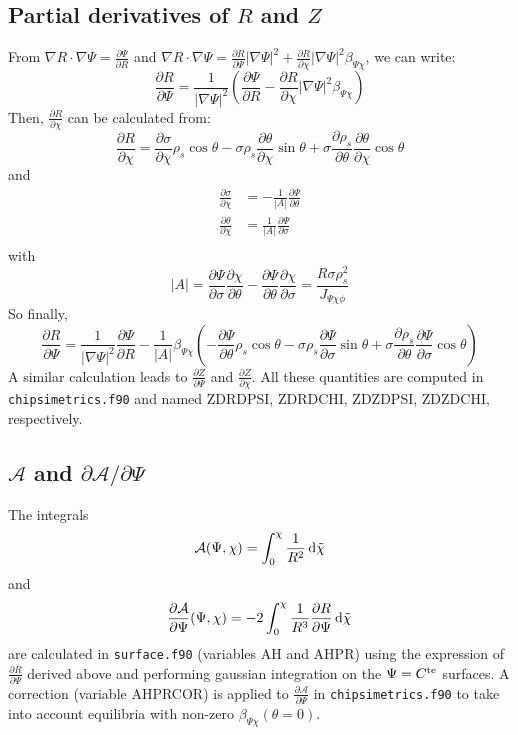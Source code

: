 \documentclass[a4paper,12pt]{article}
\newcommand{\expo}[1]{\ensuremath{^{\rm{#1}}}}
\begin{document}
\subsection{Partial derivatives of $R$ and $Z$}
From $\nabla R\cdot \nabla \Psi=\frac{\partial \Psi}{\partial R}$ and $\nabla R\cdot \nabla \Psi= \frac{\partial R}{\partial \Psi}|\nabla \Psi|^2 + \frac{\partial R}{\partial \chi}|\nabla \Psi|^2 \beta_{\Psi \chi}$, we can write:
$$\frac{\partial R}{\partial \Psi}= \frac{1}{|\nabla \Psi|^2}\left( \frac{\partial \Psi}{\partial R} - \frac{\partial R}{\partial \chi}|\nabla \Psi|^2 \beta_{\Psi \chi}\right)$$
Then, $\frac{\partial R}{\partial \chi}$ can be calculated from:
$$\frac{\partial R}{\partial \chi}=\frac{\partial \sigma}{\partial \chi}\rho_s\cos{\theta}-\sigma\rho_s\frac{\partial \theta}{\partial \chi}\sin{\theta} +\sigma  \frac{\partial \rho_s}{\partial\theta} \frac{\partial\theta}{\partial\chi}\cos{\theta}$$
and
\begin{align*}
\frac{\partial\sigma}{\partial\chi}&=-\frac{1}{|A|}\frac{\partial\Psi}{\partial\theta}\\
\frac{\partial\theta}{\partial\chi}&=\frac{1}{|A|}\frac{\partial\Psi}{\partial\sigma}\\
\end{align*}
with 
$$|A|=\frac{\partial \Psi}{\partial \sigma}\frac{\partial\chi}{\partial\theta} - \frac{\partial\Psi}{\partial\theta}\frac{\partial\chi}{\partial\sigma}= \frac{R\sigma\rho_s^2}{J_{\Psi\chi\phi}}$$
So finally,
$$\frac{\partial R}{\partial \Psi}=\frac{1}{|\nabla \Psi|^2}\frac{\partial \Psi}{\partial R}-\frac{1}{|A|}\beta_{\Psi \chi}\left( - \frac{\partial \Psi}{\partial \theta}\rho_s\cos{\theta}-\sigma\rho_s\frac{\partial \Psi}{\partial \sigma}\sin{\theta} +\sigma  \frac{\partial \rho_s}{\partial\theta} \frac{\partial\Psi}{\partial\sigma}\cos{\theta}\right)$$
A similar calculation leads to $\frac{\partial Z}{\partial \Psi}$ and $\frac{\partial Z}{\partial \chi}$. All these quantities are computed in \texttt{chipsimetrics.f90} and named ZDRDPSI, ZDRDCHI, ZDZDPSI, ZDZDCHI, respectively.

\subsection{$\mathcal{A}$ and $\partial\mathcal{A}/\partial\Psi$}
The integrals
$$\mathcal{A}(\Psi,\chi)=\int_0^\chi \frac{1}{R^2}\,{\rm d}\tilde{\chi}$$
and 
$$\frac{\partial\mathcal{A}}{\partial \Psi}(\Psi,\chi)=-2\int_0^\chi \frac{1}{R^3}\frac{\partial R}{\partial \Psi}\,{\rm d}\tilde{\chi}$$
are calculated in \texttt{surface.f90} (variables AH and AHPR) using the expression of $\frac{\partial R}{\partial \Psi}$ derived above and performing gaussian integration on the $\Psi=C\expo{te}$ surfaces. A correction (variable AHPRCOR) is applied to $\frac{\partial\mathcal{A}}{\partial \Psi}$ in \texttt{chipsimetrics.f90} to take into account equilibria with non-zero $\beta_{\Psi \chi}\left(\theta=0\right)$.
\end{document}
